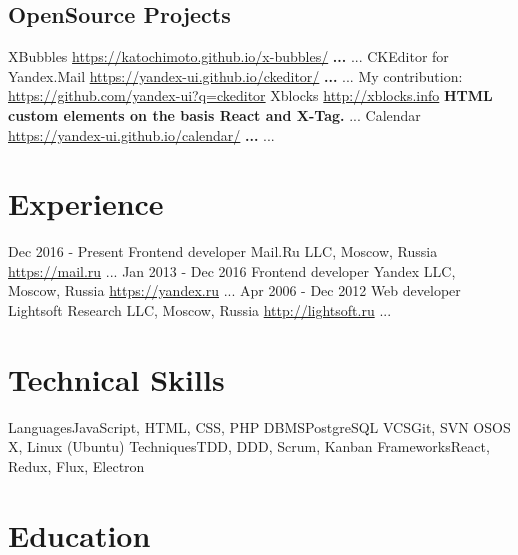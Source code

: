 \documentclass[11pt,a4paper]{moderncv}
\begin{document}
  \subsection{OpenSource Projects}
  \cvline
    {XBubbles}
    {\url{https://katochimoto.github.io/x-bubbles/}\newline{}
    \textbf{...}\newline{}
    ...}
  \cvline
    {CKEditor for Yandex.Mail}
    {\url{https://yandex-ui.github.io/ckeditor/}\newline{}
    \textbf{...}\newline{}
    ...\newline{}
    My contribution:\newline{}
    \url{https://github.com/yandex-ui?q=ckeditor}
    }
  \cvline
    {Xblocks}
    {\url{http://xblocks.info}\newline{}
    \textbf{HTML custom elements on the basis React and X-Tag.}\newline{}
    ...}
  \cvline
    {Calendar}
    {\url{https://yandex-ui.github.io/calendar/}\newline{}
    \textbf{...}\newline{}
    ...}
\pagebreak
\section{Experience}
\cventry
  {Dec 2016 - Present}
  {Frontend developer}
  {Mail.Ru LLC, Moscow, Russia}
  {\newline{}\url{https://mail.ru}}{}
  {...}
\cventry
  {Jan 2013 - Dec 2016}
  {Frontend developer}
  {Yandex LLC, Moscow, Russia}
  {\newline{}\url{https://yandex.ru}}{}
  {...}
\cventry
  {Apr 2006 - Dec 2012}
  {Web developer}
  {Lightsoft Research LLC, Moscow, Russia}
  {\newline{}\url{http://lightsoft.ru}}{}
  {...}

\section{Technical Skills}
\cvline
  {Languages}{JavaScript, HTML, CSS, PHP}
\cvline
  {DBMS}{PostgreSQL}
\cvline
  {VCS}{Git, SVN}
\cvline
  {OS}{OS X, Linux (Ubuntu)}
\cvline
  {Techniques}{TDD, DDD, Scrum, Kanban}
\cvline
  {Frameworks}{React, Redux, Flux, Electron}

\section{Education}
\end{document}

